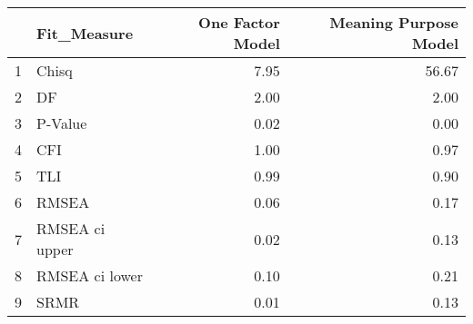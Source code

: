 \documentclass{article}\usepackage[]{graphicx}\usepackage[]{color}
\begin{document}
\begin{table}[ht]
\centering
\begin{tabular}{rlrr}
  \hline
 & Fit\_Measure & One Factor Model & Meaning Purpose Model \\ 
  \hline
1 & Chisq & 7.95 & 56.67 \\ 
  2 & DF & 2.00 & 2.00 \\ 
  3 & P-Value & 0.02 & 0.00 \\ 
  4 & CFI & 1.00 & 0.97 \\ 
  5 & TLI & 0.99 & 0.90 \\ 
  6 & RMSEA & 0.06 & 0.17 \\ 
  7 & RMSEA ci upper & 0.02 & 0.13 \\ 
  8 & RMSEA ci lower & 0.10 & 0.21 \\ 
  9 & SRMR & 0.01 & 0.13 \\ 
   \hline
\end{tabular}
\end{table}
\end{document}
